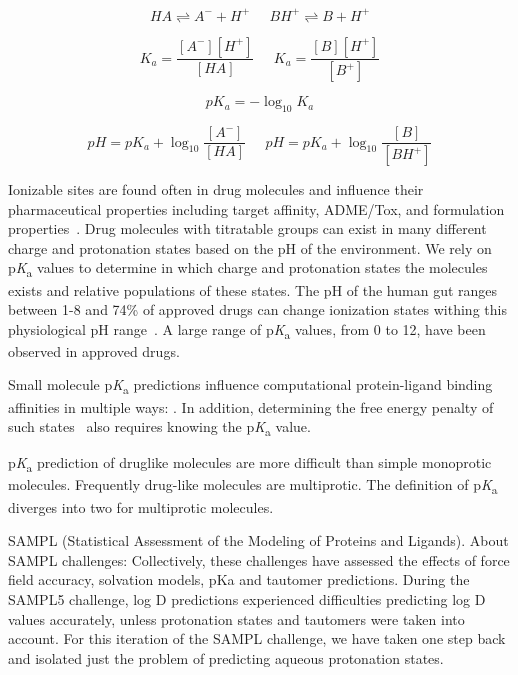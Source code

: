 \documentclass[9pt,lineno,final]{elife}
\newcommand{\pKa}{p\textit{K}\textsubscript{a}}
\begin{document}
\begin{equation}
HA \rightleftharpoons A^- + H^+ \;\;\;\;\; BH^+ \rightleftharpoons B + H^+
\end{equation}

\begin{equation}
K_a = \frac{[A^-][H^+]}{[HA]}\;\;\;\;\;K_a = \frac{[B][H^+]}{[B^+]} 
\end{equation}


\begin{equation}
pK_a = -\log_{10}{K_a}
\end{equation}


\begin{equation}
pH = pK_a + \log_{10}{\frac{[A^-]}{[HA]}}\;\;\;\;\;pH = pK_a + \log_{10}{\frac{[B]}{[BH^+]}}
\end{equation}


Ionizable sites are found often in drug molecules and influence their pharmaceutical properties including target affinity, ADME/Tox, and formulation properties~\citep{Manallack:2013:ChemSocRev}. 
Drug molecules with titratable groups can exist in many different charge and protonation states based on the pH of the environment. 
We rely on \pKa{} values to determine in which charge and protonation states the molecules exists and relative populations of these states. 
The pH of the human gut ranges between 1-8 and 74\% of approved drugs can change ionization states withing this physiological pH range~\citep{Manallack:2013:ChemMedChema}. A large range of \pKa{} values, from 0 to 12,  have been observed in approved drugs.

Small molecule \pKa{} predictions influence computational protein-ligand binding affinities in multiple ways: 
.
In addition, determining the free energy penalty of such states~\citep{deOliveira:2019:J.Chem.TheoryComput.} also requires knowing the \pKa{} value. 


\pKa{} prediction of druglike molecules are more difficult than simple monoprotic molecules. Frequently drug-like molecules are multiprotic. The definition of \pKa{} diverges into two for multiprotic molecules.

SAMPL (Statistical Assessment of the Modeling of Proteins and Ligands). About SAMPL challenges: Collectively, these challenges have assessed the effects of force field accuracy, solvation models, pKa and tautomer predictions.  
During the SAMPL5 challenge, log D predictions experienced difficulties predicting log D values accurately, unless protonation states and tautomers were taken into account.
For this iteration of the SAMPL challenge, we have taken one step back and isolated just the problem of predicting aqueous protonation states.
\end{document}
